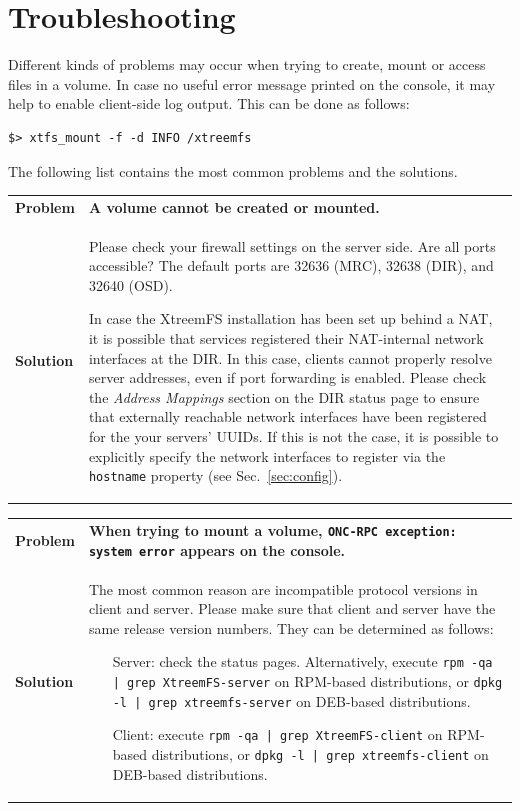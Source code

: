 \documentclass[a4paper,10pt]{book}
\begin{document}
\section{Troubleshooting}

Different kinds of problems may occur when trying to create, mount or access files in a volume. In case no useful error message printed on the console, it may help to enable client-side log output. This can be done as follows:

\begin{verbatim}
$> xtfs_mount -f -d INFO /xtreemfs
\end{verbatim}

The following list contains the most common problems and the solutions.

\begin{tabular}{lp{10cm}}
 \textbf{Problem}  & \textbf{A volume cannot be created or mounted.} \\
 \textbf{Solution} & Please check your firewall settings on the server side. Are all ports accessible? The default ports are 32636 (MRC), 32638 (DIR), and 32640 (OSD).

 In case the XtreemFS installation has been set up behind a NAT, it is possible that services registered their NAT-internal network interfaces at the DIR. In this case, clients cannot properly resolve server addresses, even if port forwarding is enabled. Please check the \emph{Address Mappings} section on the DIR status page to ensure that externally reachable network interfaces have been registered for the your servers' UUIDs. If this is not the case, it is possible to explicitly specify the network interfaces to register via the \texttt{hostname} property (see Sec.\ \ref{sec:config}).
\end{tabular}

\begin{tabular}{lp{10cm}}
 \textbf{Problem} & \textbf{When trying to mount a volume, \texttt{ONC-RPC exception: system error} appears on the console.}\\
 \textbf{Solution} & The most common reason are incompatible protocol versions in client and server. Please make sure that client and server have the same release version numbers. They can be determined as follows:
   \begin{itemize}
    \item[Server:] check the status pages. Alternatively, execute \texttt{rpm -qa | grep XtreemFS-server} on RPM-based distributions, or \texttt{dpkg -l | grep xtreemfs-server} on DEB-based distributions.
    \item[Client:] execute \texttt{rpm -qa | grep XtreemFS-client} on RPM-based distributions, or \texttt{dpkg -l | grep xtreemfs-client} on DEB-based distributions.
   \end{itemize}
\end{tabular}
\end{document}
